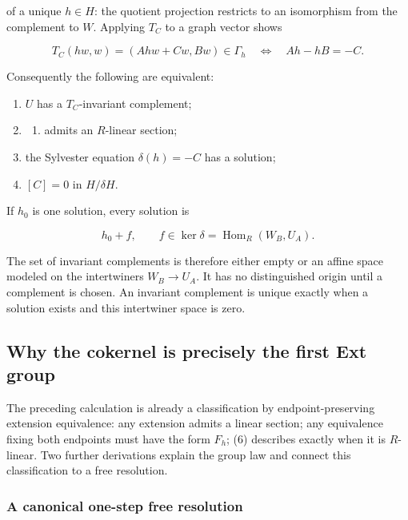 \documentclass[
  11pt,
]{article}
\providecommand{\tightlist}{%
  \setlength{\itemsep}{0pt}\setlength{\parskip}{0pt}}
\begin{document}
of a unique \(h\in H\): the quotient projection restricts to an
isomorphism from the complement to \(W\). Applying \(T_C\) to a graph
vector shows

\[T_C(hw,w)=(Ahw+Cw,Bw)\in\Gamma_h
\quad\Longleftrightarrow\quad Ah-hB=-C.\tag{7}\]

Consequently the following are equivalent:

\begin{enumerate}
\def\labelenumi{\arabic{enumi}.}
\tightlist
\item
  \(U\) has a \(T_C\)-invariant complement;
\item
  \begin{enumerate}
  \def\labelenumii{(\arabic{enumii})}
  \tightlist
  \item
    admits an \(R\)-linear section;
  \end{enumerate}
\item
  the Sylvester equation \(\delta(h)=-C\) has a solution;
\item
  \([C]=0\) in \(H/\delta H\).
\end{enumerate}

If \(h_0\) is one solution, every solution is

\[h_0+f,\qquad f\in\ker\delta
=\operatorname{Hom}_R(W_B,U_A).\tag{8}\]

The set of invariant complements is therefore either empty or an affine
space modeled on the intertwiners \(W_B\to U_A\). It has no
distinguished origin until a complement is chosen. An invariant
complement is unique exactly when a solution exists and this intertwiner
space is zero.

\subsection{Why the cokernel is precisely the first Ext
group}\label{why-the-cokernel-is-precisely-the-first-ext-group}

The preceding calculation is already a classification by
endpoint-preserving extension equivalence: any extension admits a linear
section; any equivalence fixing both endpoints must have the form
\(F_h\); (6) describes exactly when it is \(R\)-linear. Two further
derivations explain the group law and connect this classification to a
free resolution.

\subsubsection{A canonical one-step free
resolution}\label{a-canonical-one-step-free-resolution}
\end{document}
